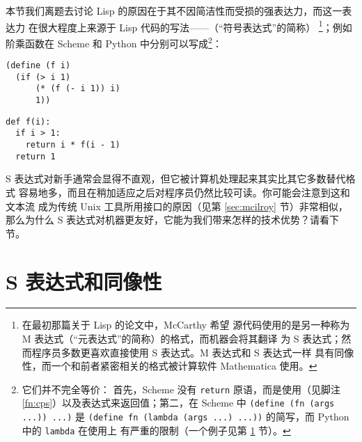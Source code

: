 本节我们离题去讨论 Lisp 的原因在于其不因简洁性而受损的强表达力，而这一表达力
在很大程度上来源于 Lisp 代码的写法——（“符号表达式”的简称）%
\footnote{在最初那篇关于 Lisp 的论文中，McCarthy 希望
源代码使用的是另一种称为 M 表达式（“元表达式”的简称）的格式，而机器会将其翻译
为 S 表达式；然而程序员多数更喜欢直接使用 S 表达式。M 表达式和 S 表达式一样
具有同像性，而一个和前者紧密相关的格式被计算软件 Mathematica 使用。}；例如
阶乘函数在 Scheme 和 Python 中分别可以写成\footnote{它们并不完全等价：
首先，Scheme 没有 \texttt{return} 原语，而是使用（见脚注
\ref{fn:cps}）以及表达式来返回值；第二，在 Scheme 中
\texttt{(define (fn (args ...)) ...)} 是 \texttt{(define fn (lambda
(args ...) ...))} 的简写，而 Python 中的 \texttt{lambda} 在使用上
有严重的限制（一个例子见第 \ref{sec:homoiconic} 节）。}：
\colskipa\begin{multicols}{2}
\begin{wquoting}
\begin{Verbatim}
(define (f i)
  (if (> i 1)
      (* (f (- i 1)) i)
      1))
\end{Verbatim}
\end{wquoting}
\begin{wquoting}
\begin{Verbatim}
def f(i):
  if i > 1:
    return i * f(i - 1)
  return 1
\end{Verbatim}
\end{wquoting}
\end{multicols}\colskipb\noindent%
S 表达式对新手通常会显得不直观，但它被计算机处理起来其实比其它多数替代格式
容易地多，而且在稍加适应之后对程序员仍然比较可读。你可能会注意到这和文本流
成为传统 Unix 工具所用接口的原因（见第 \ref{sec:mcilroy} 节）非常相似，
那么为什么 S 表达式对机器更友好，它能为我们带来怎样的技术优势？请看下节。

\newpart
\section{S 表达式和同像性}\label{sec:homoiconic}

